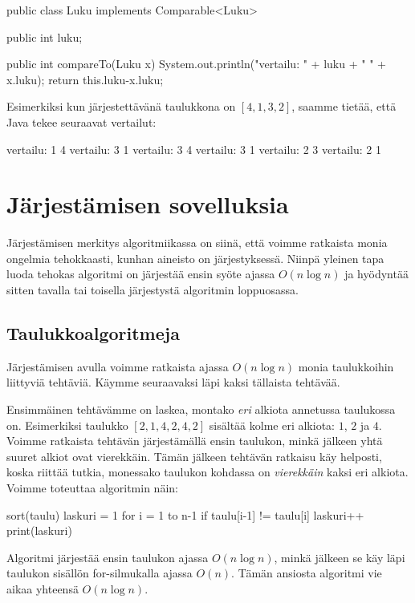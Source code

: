\begin{code}
public class Luku implements Comparable<Luku> {
    public int luku;

    public int compareTo(Luku x) {
        System.out.println("vertailu: " + luku + " " + x.luku);
        return this.luku-x.luku;
    }
}
\end{code}

Esimerkiksi kun järjestettävänä taulukkona on $[4,1,3,2]$,
saamme tietää, että Java tekee seuraavat vertailut:

\begin{code}
vertailu: 1 4
vertailu: 3 1
vertailu: 3 4
vertailu: 3 1
vertailu: 2 3
vertailu: 2 1
\end{code}

\section{Järjestämisen sovelluksia}

Järjestämisen merkitys algoritmiikassa on siinä,
että voimme ratkaista monia ongelmia tehokkaasti, 
kunhan aineisto on järjestyksessä.
Niinpä yleinen tapa luoda tehokas algoritmi on järjestää
ensin syöte ajassa $O(n \log n)$ ja hyödyntää sitten
tavalla tai toisella järjestystä algoritmin loppuosassa.

\subsection{Taulukkoalgoritmeja}

\label{sec:taukas}

Järjestämisen avulla voimme ratkaista ajassa
$O(n \log n)$ monia taulukkoihin liittyviä tehtäviä.
Käymme seuraavaksi läpi kaksi tällaista tehtävää.

Ensimmäinen tehtävämme on laskea,
montako \emph{eri} alkiota annetussa taulukossa on.
Esimerkiksi taulukko $[2,1,4,2,4,2]$ sisältää kolme
eri alkiota: $1$, $2$ ja $4$.
Voimme ratkaista tehtävän järjestämällä ensin taulukon,
minkä jälkeen yhtä suuret alkiot ovat vierekkäin.
Tämän jälkeen tehtävän ratkaisu käy helposti,
koska riittää tutkia, monessako taulukon kohdassa on
\emph{vierekkäin} kaksi eri alkiota.
Voimme toteuttaa algoritmin näin:

\begin{code}
sort(taulu)
laskuri = 1
for i = 1 to n-1
    if taulu[i-1] != taulu[i]
        laskuri++
print(laskuri)
\end{code}

Algoritmi järjestää ensin taulukon ajassa $O(n \log n)$,
minkä jälkeen se käy läpi taulukon sisällön for-silmukalla
ajassa $O(n)$.
Tämän ansiosta algoritmi vie aikaa yhteensä $O(n \log n)$.


